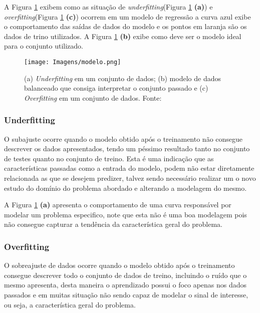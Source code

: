 \documentclass[
12pt,				%
oneside,			%
a4paper,			%
english,			%
french,				%
spanish,			%
brazil				%
]{abntex2}
\begin{document}
A Figura \ref{figura:overundbal} exibem como as situação de \textit{underfitting}(Figura \ref{figura:overundbal}\textbf{ (a)}) e \textit{overfitting}(Figura \ref{figura:overundbal}\textbf{ (c)}) ocorrem em um modelo de regressão a curva azul exibe o comportamento das saídas de dados do modelo e os pontos em laranja são os dados de trino utilizados. A Figura \ref{figura:overundbal}\textbf{ (b)} exibe como deve ser o modelo ideal para o conjunto utilizado.    

\begin{figure}[H]
	\caption{(a) \textit{Underfitting} em um conjunto de dados; (b) modelo de dados balanceado que consiga interpretar o conjunto passado e (c) \textit{Overfitting} em um conjunto de dados. Fonte:\cite{aws2019}}
	\centering %
	\texttt{[image: Imagens/modelo.png]} %
	\label{figura:overundbal}

\end{figure}


\subsubsection{Underfitting}

O subajuste ocorre quando o modelo obtido após o treinamento não consegue descrever os dados apresentados, tendo um péssimo resultado tanto no conjunto de testes quanto no conjunto de treino. Esta é uma indicação que as características passadas como a entrada do modelo, podem não estar diretamente relacionada as que se desejem predizer, talvez sendo necessário realizar um o novo estudo do domínio do problema abordado e alterando a modelagem do mesmo. 

A Figura \ref{figura:overundbal}\textbf{ (a)} apresenta o comportamento de uma curva responsável por modelar um problema especifico, note que esta não é uma boa modelagem pois não consegue capturar a tendência da característica geral do problema.

\subsubsection{Overfitting}

O sobreajuste de dados ocorre quando o modelo obtido após o treinamento consegue descrever todo o conjunto de dados de treino, incluindo o ruído que o mesmo apresenta, desta maneira o aprendizado possui o foco apenas nos dados passados e em muitas situação não sendo capaz de modelar o sinal de interesse, ou seja, a característica geral do problema. 
\end{document}
